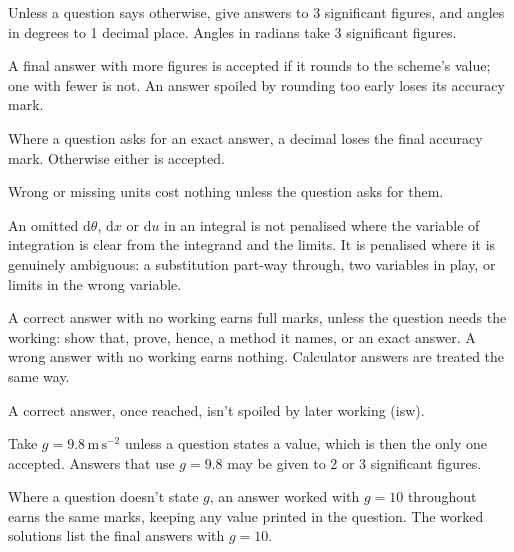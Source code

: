 \begin{msList}
\item Unless a question says otherwise, give answers to 3 significant
  figures, and angles in degrees to 1 decimal place. Angles in radians take
  3 significant figures.
\item A final answer with more figures is accepted if it rounds to the
  scheme's value; one with fewer is not. An answer spoiled by rounding too
  early loses its accuracy mark.
\item Where a question asks for an exact answer, a decimal loses the final
  accuracy mark. Otherwise either is accepted.
\item Wrong or missing units cost nothing unless the question asks for them.
\item An omitted $\mathrm{d}\theta$, $\mathrm{d}x$ or $\mathrm{d}u$ in an
  integral is not penalised where the variable of integration is clear from
  the integrand and the limits. It is penalised where it is genuinely
  ambiguous: a substitution part-way through, two variables in play, or
  limits in the wrong variable.
\item A correct answer with no working earns full marks, unless the question
  needs the working: show that, prove, hence, a method it names, or an exact
  answer. A wrong answer with no working earns nothing. Calculator answers
  are treated the same way.
\item A correct answer, once reached, isn't spoiled by later working (isw).
\end{msList}

\begin{msList}
\item Take $g = 9.8\,\mathrm{m\,s^{-2}}$ unless a question states a value,
  which is then the only one accepted. Answers that use $g = 9.8$ may be
  given to 2 or 3 significant figures.
\item Where a question doesn't state $g$, an answer worked with $g = 10$
  throughout earns the same marks, keeping any value printed in the
  question. The worked solutions list the final answers with $g = 10$.
\end{msList}
